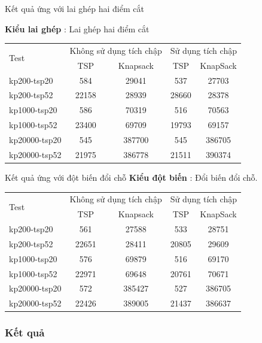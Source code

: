 \documentclass[compress]{beamer}
\begin{document}
\begin{frame}{Kết quả ứng với lai ghép hai điểm cắt}


\textbf{Kiểu lai ghép} : Lai ghép hai điểm cắt

\begin{longtable}{|l |c |c |c |c|}
\hline
\multirow{2}{*}{Test} 
& \multicolumn{2}{c|}{Không sử dụng tích chập} &\multicolumn{2}{|c|}{Sử dụng tích chập} \\
\cline{2-5}
&TSP & Knapsack & TSP & KnapSack \\
\hline
kp200-tsp20  & 584&29041 &537 &27703 
\\ \hline
kp200-tsp52&22158 &28939&28660 &28378 \\ \hline
kp1000-tsp20 &586&70319&516&70563 \\ \hline
kp1000-tsp52 &23400&69709&19793&69157 \\ \hline
kp20000-tsp20 &545&387700&545 &386705 \\ \hline
kp20000-tsp52 &21975&386778&21511& 390374\\ \hline
\end{longtable}

\end{frame}

\begin{frame}{Kết quả ứng với đột biến đổi chỗ}
\textbf{Kiểu đột biến} : Đổi biến đổi chỗ.

\begin{longtable}{|l |c |c |c |c|}
\hline
\multirow{2}{*}{Test} 
& \multicolumn{2}{c|}{Không sử dụng tích chập} &\multicolumn{2}{|c|}{Sử dụng tích chập} \\
\cline{2-5}
&TSP & Knapsack & TSP & KnapSack \\
\hline
kp200-tsp20  & 561&27588 &533 &28751 
\\ \hline
kp200-tsp52&22651 &28411&20805 &29609 \\ \hline
kp1000-tsp20 &576&69879&516&69170 \\ \hline
kp1000-tsp52 &22971&69648&20761&70671 \\ \hline
kp20000-tsp20 &572&385427&527 &386705 \\ \hline

kp20000-tsp52 &22426 & 389005 & 21437 & 386637\\
\hline
\end{longtable}

\end{frame}


\subsubsection{Kết quả}
\end{document}
